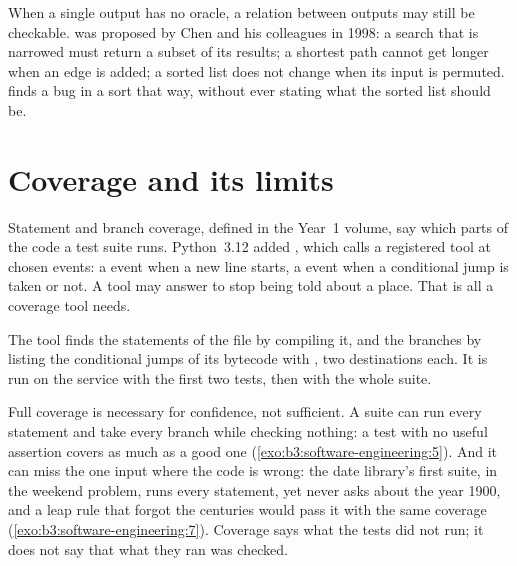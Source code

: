 When a single output has no oracle, a relation between outputs may still be checkable.  was proposed by Chen and his colleagues in 1998: %
a search that is narrowed must return a subset of its results; a shortest path cannot get longer when an edge is added; a sorted list does not change when its input is permuted.  finds a bug in a sort that way, without ever stating what the sorted list should be.

\section{Coverage and its limits}\label{sec:b3:software-engineering:coverage}

Statement and branch coverage, defined in the Year~1 volume, say which parts of the code a test suite runs. Python~3.12 added , which calls a registered tool at chosen events: a  event when a new line starts, a  event when a conditional jump is taken or not. A tool may answer  to stop being told about a place. %
That is all a coverage tool needs.

\label{lst:b3:software-engineering:coverage}

The tool finds the statements of the file by compiling it, and the branches by listing the conditional jumps of its bytecode with , two destinations each. It is run on the service with the first two tests, then with the whole suite.

\label{out:b3:software-engineering:coverage}

Full coverage is necessary for confidence, not sufficient. A suite can run every statement and take every branch while checking nothing: a test with no useful assertion covers as much as a good one (\cref{exo:b3:software-engineering:5}). And it can miss the one input where the code is wrong: the date library's first suite, in the weekend problem, runs every statement, yet never asks about the year 1900, and a leap rule that forgot the centuries would pass it with the same coverage (\cref{exo:b3:software-engineering:7}). Coverage says what the tests did not run; it does not say that what they ran was checked.

